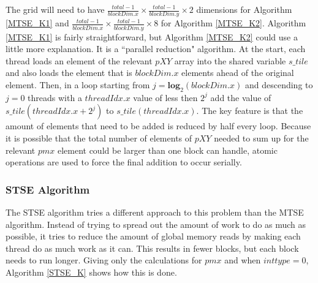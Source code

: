 The grid will need to have $\frac{total - 1}{blockDim.x} \times \frac{total - 1}{blockDim.y} \times 2$ dimensions for Algorithm \ref{MTSE_K1} and $\frac{total - 1}{blockDim.x} \times \frac{total - 1}{blockDim.y} \times 8$ for Algorithm \ref{MTSE_K2}. Algorithm \ref{MTSE_K1} is fairly straightforward, but Algorithm \ref{MTSE_K2} could use a little more explanation. It is a ``parallel reduction" algorithm. At the start, each thread loads an element of the relevant $pXY$ array into the shared variable $s\_tile$ and also loads the element that is $blockDim.x$ elements ahead of the original element. Then, in a loop starting from $j= \textbf{log}_{2}(blockDim.x)$ and descending to $j = 0$ threads with a $threadIdx.x$ value of less then $2^{j}$ add the value of  $s\_tile(threadIdx.x + 2^{j})$ to $s\_tile(threadIdx.x)$. The key feature is that the amount of elements that need to be added is reduced by half every loop. Because it is possible that the total number of elements of $pXY$ needed to sum up for the relevant $pmx$ element could be larger than one block can handle, atomic operations are used to force the final addition to occur serially.

\subsubsection{STSE Algorithm}
The STSE algorithm tries a different approach to this problem than the MTSE algorithm. Instead of trying to spread out the amount of work to do as much as possible, it tries to reduce the amount of global memory reads by making each thread do as much work as it can. This results in fewer blocks, but each block needs to run longer. Giving only the calculations for $pmx$ and when $inttype = 0$, Algorithm \ref{STSE_K} shows how this is done.

